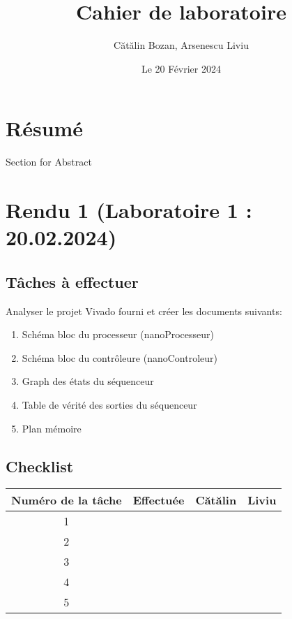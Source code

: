 \documentclass{article}
\title{Cahier de laboratoire}
\date{Le 20 Février 2024}
\author{Cătălin Bozan, Arsenescu Liviu}
\begin{document}
    \maketitle
    \newpage

    \section*{Résumé}
    Section for Abstract
    \newpage

    \tableofcontents
    \newpage

    \section{Rendu 1 (Laboratoire 1 : 20.02.2024)}
    \subsection{Tâches à effectuer}
    Analyser le projet Vivado fourni et créer les documents suivants:
    \begin{enumerate}
        \item Schéma bloc du processeur (nanoProcesseur)
        \item Schéma bloc du contrôleure (nanoControleur)
        \item Graph des états du séquenceur
        \item Table de vérité des sorties du séquenceur
        \item Plan mémoire
    \end{enumerate}
    \subsection{Checklist}
    \begin{center}
        \begin{tabular}{|c|c|c|c|}
            \hline
            Numéro de la tâche & Effectuée & Cătălin & Liviu \\
            \hline
            \hline 1 &   &   &   \\ 
            \hline 2 &   &   &   \\
            \hline 3 &   &   &   \\
            \hline 4 &   &   &   \\
            \hline 5 &   &   &   \\
            \hline
        \end{tabular}
    \end{center}
    \newpage
\end{document}
